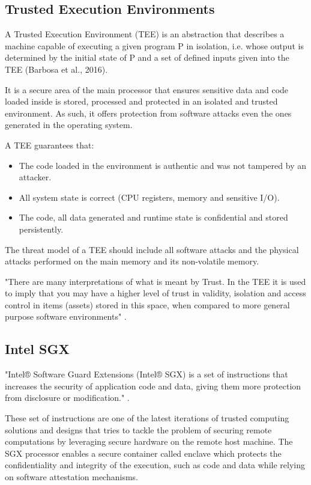 \subsection{Trusted Execution Environments} %
\label{ssec:trusted_execution_environments}

A Trusted Execution Environment (\gls{TEE}) is an abstraction that describes a machine
capable of executing a given program P in isolation, i.e. whose output is determined by
the initial state of P and a set of defined inputs given into the \gls{TEE} (Barbosa et al., 2016).

It is a secure area of the main processor that ensures sensitive data and code loaded inside is stored, processed and protected in an isolated and trusted environment. As such, it offers protection from software attacks even the ones generated in the operating system.

A \gls{TEE} guarantees that: 
\begin{itemize}
	\item The code loaded in the environment is authentic and was not tampered by an attacker.
	\item All system state is correct (CPU registers, memory and sensitive I/O).
	\item The code, all data generated and runtime state is confidential and stored persistently.
\end{itemize}

The threat model of a \gls{TEE} should include all software attacks and the physical attacks performed on the main memory and its non-volatile memory.

"There are many interpretations of what is meant by Trust. In the \gls{TEE} it is used to imply that you may have a higher level of trust in validity, isolation and access control in items (assets) stored in this space, when compared to more general purpose software environments" \cite{tee:1}.

\subsection{Intel SGX} %
\label{ssec:intel_sgx}

"Intel® Software Guard Extensions (Intel® SGX) is a set of instructions that increases the security of application code and data, giving them more protection from disclosure or modification." \cite{sgx:3}.

These set of instructions are one of the latest iterations of trusted computing solutions and designs that tries to tackle the problem of securing remote computations by leveraging secure hardware on the remote host machine. The SGX processor enables a secure container called enclave which protects the confidentiality and integrity of the execution, such as code and data while relying on software attestation mechanisms.

